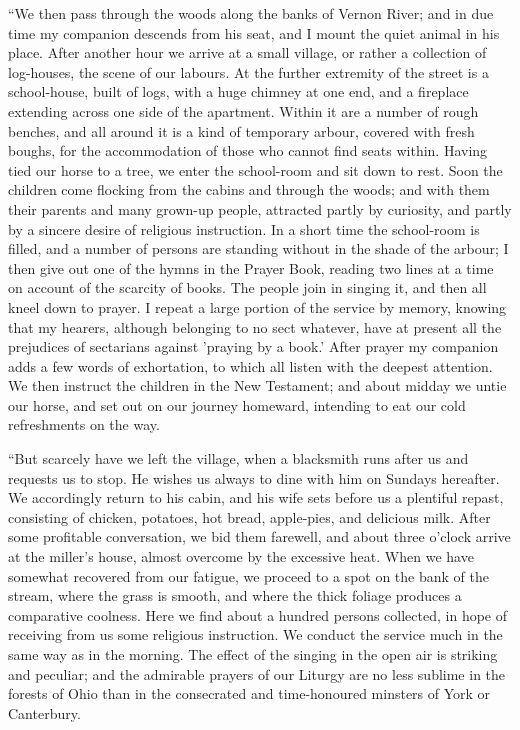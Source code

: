``We
then pass through the woods along the banks of Vernon River; and in
due time my companion descends from his seat, and I mount the quiet
animal in his place. After another hour we arrive at a small village,
or rather a collection of log-houses, the scene of our labours. At the
further extremity of the street is a school-house, built of logs, with
a huge chimney at one end, and a fireplace extending across one side
of the apartment. Within it are a number of rough benches, and all
around it is a kind of temporary arbour, covered with fresh boughs,
for the accommodation of those who cannot find seats within. Having
tied our horse to a tree, we enter the school-room and sit down to
rest. Soon the children come flocking from the cabins and through the
woods; and with them their parents and many grown-up people, attracted
partly by curiosity, and partly by a sincere desire of religious
instruction. In a short time the school-room is filled, and a number
of persons are standing without in the shade of the arbour; I then
give out one of the hymns in the Prayer Book, reading two lines at a
time on account of the scarcity of books. The people join in singing
it, and then all kneel down to prayer. I repeat a large portion of the
service by memory, knowing that my hearers, although belonging
to no sect whatever, have at present all the prejudices of sectarians
against 'praying by a book.' After prayer my companion adds a few
words of exhortation, to which all listen with the deepest attention.
We then instruct the children in the New Testament; and about midday
we untie our horse, and set out on our journey homeward, intending to
eat our cold refreshments on the way.

``But
scarcely have we left the village, when a blacksmith runs after us and
requests us to stop. He wishes us always to dine with him on Sundays
hereafter. We accordingly return to his cabin, and his wife sets
before us a plentiful repast, consisting of chicken, potatoes, hot
bread, apple-pies, and delicious milk. After some profitable
conversation, we bid them farewell, and about three o'clock arrive at
the miller's house, almost overcome by the excessive heat. When we
have somewhat recovered from our fatigue, we proceed to a spot on the
bank of the stream, where the grass is smooth, and where the thick
foliage produces a comparative coolness. Here we find about a hundred
persons collected, in hope of receiving from us some religious
instruction. We conduct the service much in the same way as in the
morning. The effect of the singing in the open air is striking and
peculiar; and the admirable prayers of our Liturgy are no less sublime
in the forests of Ohio than in the consecrated and time-honoured
minsters of York or Canterbury.


